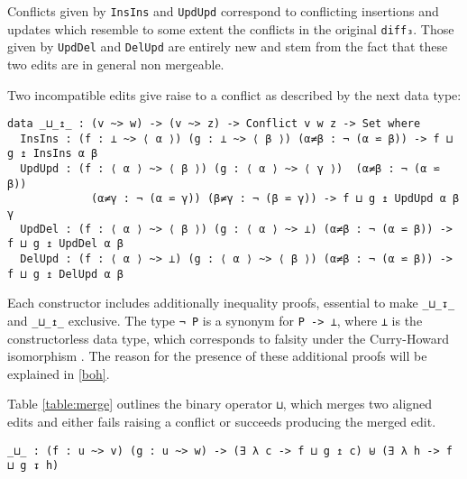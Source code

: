\documentclass[../Thesis.tex]{subfiles}
\begin{document}
	Conflicts given by \texttt{InsIns} and \texttt{UpdUpd}	 correspond to 
	conflicting insertions and updates which resemble to some extent the
	conflicts in the original \texttt{diff₃}. Those given by \texttt{UpdDel} and 
	\texttt{DelUpd} are entirely new and stem from the fact that these two
	edits are in general non mergeable.
	
	Two incompatible edits give raise to a conflict as described by the
	next data type:
	
\begin{verbatim}
data _⊔_↥_ : (v ~> w) -> (v ~> z) -> Conflict v w z -> Set where
  InsIns : (f : ⊥ ~> ⟨ α ⟩) (g : ⊥ ~> ⟨ β ⟩) (α≠β : ¬ (α ⋍ β)) -> f ⊔ g ↥ InsIns α β
  UpdUpd : (f : ⟨ α ⟩ ~> ⟨ β ⟩) (g : ⟨ α ⟩ ~> ⟨ γ ⟩)  (α≠β : ¬ (α ⋍ β)) 
             (α≠γ : ¬ (α ⋍ γ)) (β≠γ : ¬ (β ⋍ γ)) -> f ⊔ g ↥ UpdUpd α β γ
  UpdDel : (f : ⟨ α ⟩ ~> ⟨ β ⟩) (g : ⟨ α ⟩ ~> ⊥) (α≠β : ¬ (α ⋍ β)) -> f ⊔ g ↥ UpdDel α β
  DelUpd : (f : ⟨ α ⟩ ~> ⊥) (g : ⟨ α ⟩ ~> ⟨ β ⟩) (α≠β : ¬ (α ⋍ β)) -> f ⊔ g ↥ DelUpd α β
\end{verbatim}
	
	Each constructor includes additionally inequality proofs, essential 
	to make \texttt{\_⊔\_↧\_} and \texttt{\_⊔\_↥\_} exclusive.
	The type \texttt{¬ P} is a synonym for \texttt{P -> ⊥}, where \texttt{⊥} is
	the constructorless data type, which corresponds to falsity 
	under the Curry-Howard isomorphism .
	The reason for the presence of these additional proofs will be explained
	in \ref{boh}. %

	Table \ref{table:merge} outlines the binary operator \texttt{⊔}, which 
	merges two aligned edits and either fails raising a conflict or succeeds 
	producing the merged edit.

\begin{verbatim}
_⊔_ : (f : u ~> v) (g : u ~> w) -> (∃ λ c -> f ⊔ g ↥ c) ⊎ (∃ λ h -> f ⊔ g ↧ h)
\end{verbatim}
		
\end{document}
